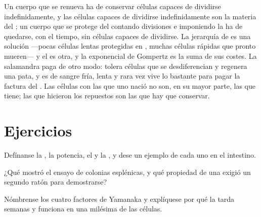 \begin{remark}\label{rem:b3:stem-cells:remark}
Un cuerpo que se renueva ha de conservar células capaces de dividirse
indefinidamente, y las células capaces de dividirse indefinidamente son
la materia del ; un cuerpo que se protege del  contando
divisiones e imponiendo la  ha de quedarse, con el tiempo,
sin células capaces de dividirse. La jerarquía de  es una
solución ---pocas células lentas protegidas en , muchas células
rápidas que pronto mueren--- y el  es otra, y la
exponencial de Gompertz es la suma de sus costes. La salamandra paga de
otro modo: tolera células que se desdiferencian y regenera una pata, y
es de sangre fría, lenta y rara vez vive lo bastante para pagar la
factura del . Las células con las que uno nació no son, en su
mayor parte, las que tiene; las que hicieron los repuestos son las que
hay que conservar.
\end{remark}

\section{Ejercicios}

\begin{exercise}[$\star$]\label{exo:b3:stem-cells:1}
Defínanse la , la potencia, el  y la , y dese un ejemplo de cada uno en el
intestino.
\end{exercise}

\begin{exercise}[$\star$]\label{exo:b3:stem-cells:2}
¿Qué mostró el ensayo de colonias esplénicas, y qué propiedad de una
 exigió un segundo ratón para demostrarse?
\end{exercise}

\begin{exercise}[$\star$]\label{exo:b3:stem-cells:3}
Nómbrense los cuatro factores de Yamanaka y explíquese por qué la
 tarda semanas y funciona en una milésima de las células.
\end{exercise}


